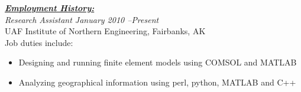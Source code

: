\documentclass[10pt, letterpaper]{article}
\renewcommand{\section}[1]{\bigskip\Large\textbf{\underline{\textit{#1}}}\normalsize\\} %
\begin{document}
\begin{comment}
Suggested by Lisa's dad, but not by Career Services.
I think this is largely irrelevant due to my possession of a bachelors degree.
\large\textit{High School Diploma \hfill May 2005}\normalsize \\
Susitna Valley Junior Senior High School\\
\emph{Graduated with a 3.73 GPA}

New section, trying it out
Currently canning this section but THAT'S OKAY
\section*{\underline{\textit{Projects:}}}
\large\textit{Super Four-Bar Explorer \hfill December 2008}\normalsize
\small\begin{itemize}
\item A program written in python that uses a Gauss-Newton unconstrained optimization algorithm to fit the path traced by a four bar linkage to a given set of points
\item Accompanied by a spreadsheet that illustrates four-bar linkage traced paths
\end{itemize}\normalsize\medskip

Another new section, recommended by Career Services. At worst, I have the
wording for it, amirite?
\section*{\underline{\textit{Service:}}}

ASME's web site, E-week volunteer

\large\textit{Society of Automotive Engineers, UAF
Chapter\hfill2009}\normalsize\\
\textit{Treasurer}
\end{comment}

\section{Employment History:}

\large\textit{Research Assistant \hfill January 2010 --Present}\normalsize \\
UAF Institute of Northern Engineering, Fairbanks, AK\\
Job duties include:
\small\begin{itemize}
\item Designing and running finite element models using COMSOL and MATLAB
\item Analyzing geographical information using perl, python, MATLAB and C++
\end{itemize}\normalsize\medskip
\end{document}
